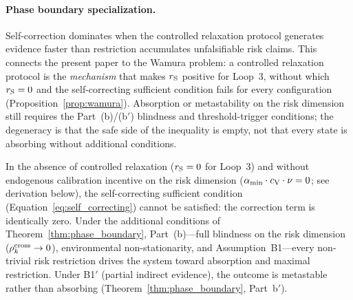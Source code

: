 \paragraph{Phase boundary specialization.}
Self-correction dominates when the controlled relaxation protocol
generates evidence faster than restriction accumulates unfalsifiable
risk claims.  This connects the present paper to the Wamura problem: a
controlled relaxation protocol is the \emph{mechanism} that makes
$r_{\mathrm{S}}$ positive for Loop~3, without which $r_{\mathrm{S}} = 0$ and the
self-correcting sufficient condition fails for every configuration
(Proposition~\ref{prop:wamura}).  Absorption or metastability on the
risk dimension still requires the Part~(b)/(b$'$) blindness and
threshold-trigger conditions; the degeneracy is that the safe side
of the inequality is empty, not that every state is absorbing without
additional conditions.

\begin{proposition}
\label{prop:wamura}
In the absence of controlled relaxation ($r_{\mathrm{S}} = 0$ for Loop~3) and
without endogenous calibration incentive on the risk dimension
($\alpha_{\min} \cdot c_{\mathrm{V}} \cdot \nu = 0$; see derivation
below), the self-correcting sufficient condition
(Equation~\ref{eq:self_correcting}) cannot be satisfied: the
correction term is identically zero.  Under the additional conditions
of Theorem~\ref{thm:phase_boundary}, Part~(b)---full blindness on the
risk dimension ($\rho^{\mathrm{cross}}_k \to 0$), environmental non-stationarity,
and Assumption~B1---every non-trivial risk restriction drives the
system toward absorption and maximal restriction.  Under B1$'$ (partial
indirect evidence), the outcome is metastable rather than absorbing
(Theorem~\ref{thm:phase_boundary}, Part~b$'$).
\end{proposition}

